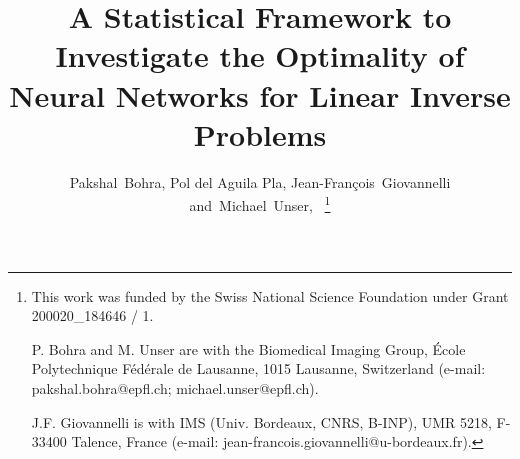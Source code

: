 \documentclass[journal]{IEEEtran}
\begin{document}
\IEEEoverridecommandlockouts


\title{A Statistical Framework to Investigate the Optimality of Neural Networks for Linear Inverse Problems}

\author{Pakshal~Bohra, Pol del Aguila Pla, Jean-Fran\c{c}ois~Giovannelli and~Michael~Unser,~%
\thanks{This work was funded by the Swiss National Science Foundation under Grant 200020\_184646 / 1.

P. Bohra and M. Unser are with the Biomedical Imaging Group, \'{E}cole Polytechnique F\'{e}d\'{e}rale de Lausanne, 1015 Lausanne, Switzerland (e-mail: pakshal.bohra@epfl.ch; michael.unser@epfl.ch).

J.F. Giovannelli is with IMS (Univ. Bordeaux, CNRS, B-INP), UMR 5218, F-33400 Talence, France (e-mail: jean-francois.giovannelli@u-bordeaux.fr).
}





}%









\maketitle

\begin{abstract}

\end{abstract}
\begin{IEEEkeywords}

\end{IEEEkeywords}
\end{document}
